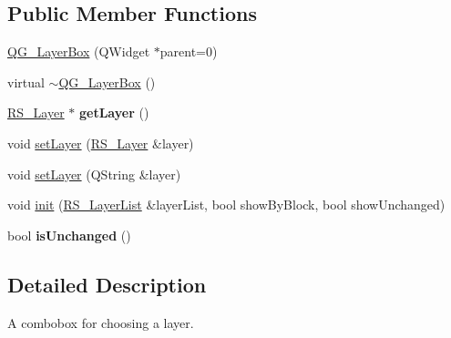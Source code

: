 \subsection*{Public Member Functions}
\begin{DoxyCompactItemize}
\item 
\hyperlink{classQG__LayerBox_a8e5e2ff80bb8aaf3cc78592006ce3d3a}{Q\-G\-\_\-\-Layer\-Box} (Q\-Widget $\ast$parent=0)
\item 
virtual \hyperlink{classQG__LayerBox_a91765bb14b412b700e7a457d9b8399c9}{$\sim$\-Q\-G\-\_\-\-Layer\-Box} ()
\item 
\hypertarget{classQG__LayerBox_aded431e9d7b048fdb32d2a247a7d2af1}{\hyperlink{classRS__Layer}{R\-S\-\_\-\-Layer} $\ast$ {\bfseries get\-Layer} ()}\label{classQG__LayerBox_aded431e9d7b048fdb32d2a247a7d2af1}

\item 
void \hyperlink{classQG__LayerBox_adbe81f81e16e644d99f8263d40f119dc}{set\-Layer} (\hyperlink{classRS__Layer}{R\-S\-\_\-\-Layer} \&layer)
\item 
void \hyperlink{classQG__LayerBox_a583a799a2cf26f88a2b995f3ea9a8b30}{set\-Layer} (Q\-String \&layer)
\item 
void \hyperlink{classQG__LayerBox_a13746b6d809fca0aba8fd8eb37aa4ecd}{init} (\hyperlink{classRS__LayerList}{R\-S\-\_\-\-Layer\-List} \&layer\-List, bool show\-By\-Block, bool show\-Unchanged)
\item 
\hypertarget{classQG__LayerBox_a602bd81fb137514592486df847d6e0db}{bool {\bfseries is\-Unchanged} ()}\label{classQG__LayerBox_a602bd81fb137514592486df847d6e0db}

\end{DoxyCompactItemize}


\subsection{Detailed Description}
A combobox for choosing a layer. 

